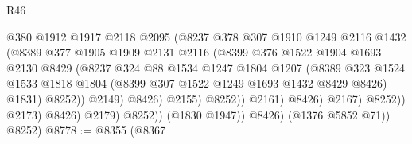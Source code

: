 \begin{lexlean}{R46}
\begin{coremodule}
                                      @380
                                      @1912
                                      @1917
                                      @2118
                                      @2095
                                      (@8237
                                        @378
                                        @307
                                        @1910
                                        @1249
                                        @2116
                                        @1432
                                        (@8389
                                          @377
                                          @1905
                                          @1909
                                          @2131
                                          @2116
                                          (@8399
                                            @376
                                            @1522
                                            @1904
                                            @1693
                                            @2130
                                            @8429
                                            (@8237
                                              @324
                                              @88
                                              @1534
                                              @1247
                                              @1804
                                              @1207
                                              (@8389
                                                @323
                                                @1524
                                                @1533
                                                @1818
                                                @1804
                                                (@8399 @307 @1522 @1249 @1693 @1432 @8429 @8426)
                                                @1831)
                                              @8252))
                                          @2149)
                                        @8426)
                                      @2155)
                                    @8252))
                                @2161)
                              @8426)
                            @2167)
                          @8252))
                      @2173)
                    @8426)
                  @2179)
                @8252))
            (@1830 @1947))
          @8426)
        (@1376 @5852 @71))
      @8252)
@8778 := @8355
    (@8367

\end{coremodule}
\end{lexlean}
